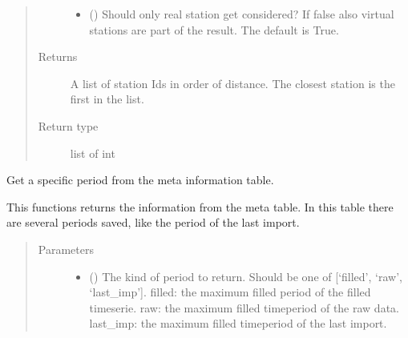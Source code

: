 \documentclass[letterpaper,10pt,english]{sphinxmanual}
\begin{document}
\begin{fulllineitems}
\begin{fulllineitems}
\begin{quote}
\begin{description}
\begin{itemize}
\item {} 
\sphinxAtStartPar
{} (\sphinxstyleliteralemphasis{\sphinxupquote{, }}) \textendash{} Should only real station get considered?
If false also virtual stations are part of the result.
The default is True.

\end{itemize}

\item[{Returns}] \leavevmode
\sphinxAtStartPar
A list of station Ids in order of distance.
The closest station is the first in the list.

\item[{Return type}] \leavevmode
\sphinxAtStartPar
list of int

\end{description}\end{quote}

\end{fulllineitems}


\begin{fulllineitems}
\label{\detokenize{weatherDB:weatherDB.station.StationBase.get_period_meta}}
\sphinxAtStartPar
Get a specific period from the meta information table.

\sphinxAtStartPar
This functions returns the information from the meta table.
In this table there are several periods saved, like the period of the last import.
\begin{quote}\begin{description}
\item[{Parameters}] \leavevmode\begin{itemize}
\item {} 
\sphinxAtStartPar
{} () \textendash{} The kind of period to return.
Should be one of {[}‘filled’, ‘raw’, ‘last\_imp’{]}.
filled: the maximum filled period of the filled timeserie.
raw: the maximum filled timeperiod of the raw data.
last\_imp: the maximum filled timeperiod of the last import.


\end{itemize}
\end{description}
\end{quote}
\end{fulllineitems}
\end{fulllineitems}
\end{document}

